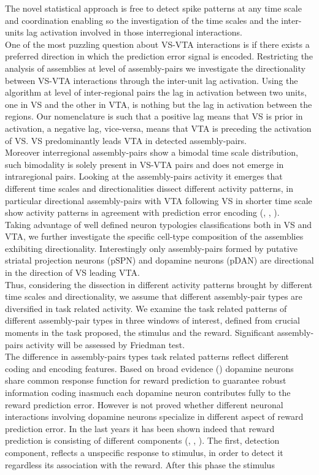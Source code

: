 The novel statistical approach is free to detect spike patterns at any time scale and coordination enabling so the investigation of the time scales and the inter-units lag activation involved in those interregional interactions.\\One of the most puzzling question about VS-VTA interactions is if there exists a preferred direction in which the prediction error signal is encoded. Restricting the analysis of assemblies at level of assembly-pairs we investigate the directionality between VS-VTA interactions through the inter-unit lag activation. Using the algorithm at level of inter-regional pairs the lag in activation between two units, one in VS and the other in VTA, is nothing but the lag in activation between the regions. Our nomenclature is such that a positive lag means that VS is prior in activation, a negative lag, vice-versa, means that VTA is preceding the activation of VS. VS predominantly leads VTA in detected assembly-pairs.\\Moreover interregional assembly-pairs show a bimodal time scale distribution, such bimodality is solely present in VS-VTA pairs and does not emerge in intraregional pairs. Looking at the assembly-pairs activity it emerges that different time scales and directionalities dissect different activity patterns, in particular directional assembly-pairs with VTA following VS in shorter time scale show activity patterns in agreement with prediction error encoding (\cite{Tobler2003}, \cite{Nomoto2010}, \cite{Schultz2016}).\\Taking advantage of well defined neuron typologies classifications both in VS and VTA, we further investigate the specific cell-type composition of the assemblies exhibiting directionality. Interestingly only assembly-pairs formed by putative striatal projection neurons (pSPN) and dopamine neurons (pDAN) are directional in the direction of VS leading VTA.\\Thus, considering the dissection in different activity patterns brought by different time scales and directionality, we assume that different assembly-pair types are diversified in task related activity. We examine the task related patterns of different assembly-pair types in three windows of interest, defined from crucial moments in the task proposed, the stimulus and the reward. Significant assembly-pairs activity will be assessed by Friedman test.\\The difference in assembly-pairs types task related patterns reflect different coding and encoding features. Based on broad evidence (\cite{Eshel}) dopamine neurons share common response function for reward prediction to guarantee robust information coding inasmuch each dopamine neuron contributes fully to the reward prediction error. However is not proved whether different neuronal interactions involving dopamine neurons specialize in different aspect of reward prediction error. In the last years it has been shown indeed that reward prediction is consisting of different components (\cite{Nomoto2010}, \cite{Fiorillo2013b}, \cite{Schultz2016}). The first, detection component, reflects a unspecific response to stimulus, in order to detect it regardless its association with the reward. After this phase the stimulus 